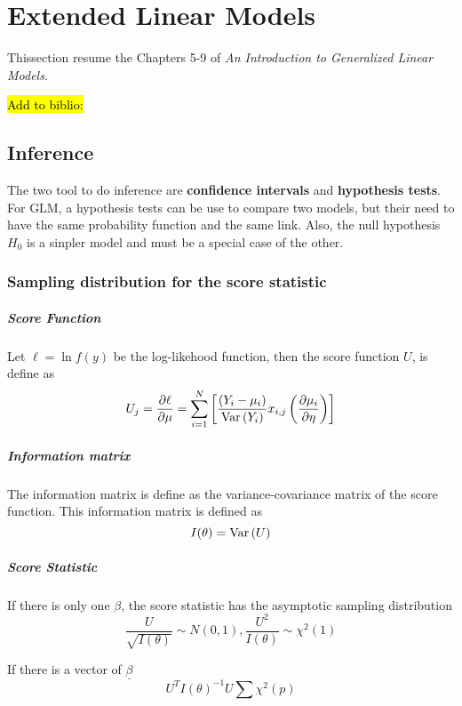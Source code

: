 \chapter{Extended Linear Models}

{ \color{red} Thissection resume the Chapters 5-9 of \emph{An Introduction to Generalized Linear Models}.}

\hl{Add to biblio:}

\section{Inference}

The two tool to do inference are \textbf{confidence intervals} and \textbf{hypothesis tests}. For GLM, a hypothesis tests can be use to compare two models, but their need to have the same probability function and the same link. Also, the null hypothesis $H_0$ is a sinpler model and must be a special case of the other. 

\subsection{Sampling distribution for the score statistic}
\paragraph{Score Function}
Let $\ell = \ln f(y)$ be the log-likehood function, then the score function $U$, is define as
\[ U_j = \frac{\partial \ell}{\partial \mu} = \sum_{i=1}^N \left[ \frac{(Y_i - \mu_i)}{\mathrm{Var} \left( Y_i \right)} x_{i,j} \left( \frac{\partial \mu_i}{\partial \eta} \right) \right] \]

\paragraph{Information matrix}
The information matrix is define as the variance-covariance matrix of the score function. This information matrix is defined as 
\[ I(\theta) = \mathrm{Var} \left( U \right) \]

\paragraph{Score Statistic}
If there is only one $\beta$, the score statistic has the asymptotic sampling distribution
\[ \frac{U}{\sqrt{I(\theta)}} \sim N(0, 1),  \frac{U^2}{I(\theta)} \sim \chi^2(1) \]

If there is a vector of $\underline{\beta}$
\[ U^T I(\theta)^{-1} U \sum \chi^2(p) \]

